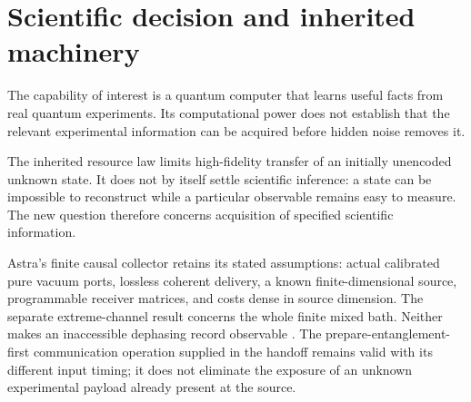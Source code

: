 \documentclass[11pt,a4paper]{article}
\begin{document}
\begin{abstract}
An unencoded $n$-qubit source experiences actual inaccessible noise $\lambda\sum_i\mathcal D[Z_i]$. All retained non-Hamiltonian operations preserve the source $Z$-parity sectors. Every remaining Hamiltonian term noncommutes with at most $k$ source $Z_i$, with summed term-norm budget $\Omega$ per source site. The receiver may have arbitrary protected memory, shared ancillas, computation, classical feedback and collective decoding. For $\Omega<2\lambda$, the complete acquired channel contracts a transverse sector of weight $w$ by at most $x_k^w$, where $x_k=\max_{1\le j\le k}(\Omega/(2\lambda j))^{1/j}<1$. For $\Omega\le\lambda$, this is $(\Omega/(2k\lambda))^{w/k}$. A finite Duhamel recursion pays hidden dephasing while each coherence remains unresolved; no initial noise layer is assumed before control.

The theorem implies exponentially many copies for fixed-$k$ global-parity readout and for distinguishing a GHZ state from its classical mixture. Any $k=o(n)$ gives superpolynomial worst-case purity-testing cost at fixed $\Omega/\lambda\le1$. Conversely, explicit finite-slew local meters acquire fixed-weight Pauli properties with polynomial work. A native $n$-body meter reads the particular global coherence with polynomial copies under the same strength and slew scales. Its extensive interaction is an explicitly different physical resource.
\end{abstract}
\tableofcontents\newpage

\section{Scientific decision and inherited machinery}

The capability of interest is a quantum computer that learns useful facts from real quantum experiments. Its computational power does not establish that the relevant experimental information can be acquired before hidden noise removes it.

The inherited resource law limits high-fidelity transfer of an initially unencoded unknown state. It does not by itself settle scientific inference: a state can be impossible to reconstruct while a particular observable remains easy to measure. The new question therefore concerns acquisition of specified scientific information.

Astra's finite causal collector retains its stated assumptions: actual calibrated pure vacuum ports, lossless coherent delivery, a known finite-dimensional source, programmable receiver matrices, and costs dense in source dimension. The separate extreme-channel result concerns the whole finite mixed bath. Neither makes an inaccessible dephasing record observable \cite{astra1732,astra1733}. The prepare-entanglement-first communication operation supplied in the handoff remains valid with its different input timing; it does not eliminate the exposure of an unknown experimental payload already present at the source.
\end{document}
